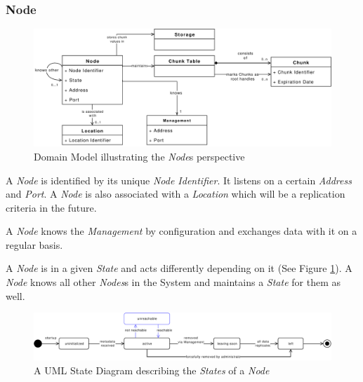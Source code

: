 \subsubsection{Node}

\begin{figure}[h]
    \centering
    \includegraphics[width=1\linewidth]{resources/node_domain_model}
    \caption[Node Domain Model]{Domain Model illustrating the \emph{Node}s perspective}
\end{figure}

A \emph{Node} is identified by its unique \emph{Node Identifier}. It listens on a certain \emph{Address} and \emph{Port}. A \emph{Node} is also associated with a \emph{Location} which will be a replication criteria in the future.

A \emph{Node} knows the \emph{Management} by configuration and exchanges data with it on a regular basis.

A \emph{Node} is in a given \emph{State} and acts differently depending on it (See Figure \ref{fig:node-states}). A \emph{Node} knows all other \emph{Nodes}s in the System and maintains a \emph{State} for them as well.

\begin{figure}[h]
    \centering
    \includegraphics[width=1\linewidth]{resources/node_state}
    \caption[Node States]{A UML State Diagram describing the \emph{States} of a \emph{Node}}
    \label{fig:node-states}
\end{figure}

